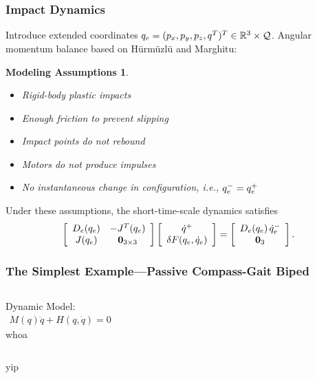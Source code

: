 \documentclass{beamer}
\newtheorem{massump}{Modeling Assumptions}
\begin{document}
\begin{frame}
\begin{columns}[t]
\begin{column}{.45\textwidth}
\begin{figure}
      \end{figure}
    \end{column}
  \end{columns}
\end{frame}

\begin{frame}
  \frametitle{Impact Dynamics}
  Introduce extended coordinates $q_{e} = (p_{x}, p_{y}, p_{z}, q^{T})^{T} \in \mathbb{R}^{3} \times \mathcal{Q}$. Angular momentum balance based on H{\"u}rm{\"u}zl{\"u} and Marghitu:
  \begin{massump}
    \begin{itemize}
    \item Rigid-body plastic impacts
    \item Enough friction to prevent slipping
    \item Impact points do not rebound
    \item Motors do not produce impulses
    \item No instantaneous change in configuration, i.e., $q_{e}^{-} = q_{e}^{+}$
    \end{itemize}
  \end{massump}
  Under these assumptions, the short-time-scale dynamics satisfies
  \begin{align*}
    \left[\begin{array}{c c}
        D_{e}(q_{e}) & -J^{T}(q_{e})\\
        J(q_{e}) & \mathbf{0}_{3 \times 3}
      \end{array}\right]
    \left[\begin{array}{c}
        \dot q^{+}\\
        \delta F(q_{e}, \dot q_{e})
      \end{array}\right]
    = \left[\begin{array}{c c}
        D_{e}(q_{e}) \, \dot q_{e}^{-}\\
        \mathbf{0}_{3}
      \end{array}\right].
  \end{align*}
\end{frame}

\begin{frame}
  \frametitle{The Simplest Example---Passive Compass-Gait Biped}

  \begin{columns}[l]
    \column{1.5in}
    Dynamic Model:
    \begin{align*}
      M(q) \ddot q + H(q, \dot q) = 0
    \end{align*}
    \column{1.5in}
    whoa
  \end{columns}
  yip
\end{frame}
\end{document}

